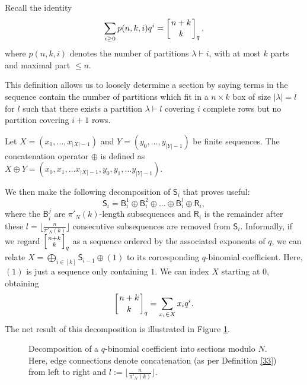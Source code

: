 \documentclass[12pt]{article}
\newcommand{\floor}[1]{{\lfloor{#1}\rfloor}}
\newcommand{\qbinom}[2]{\left[{#1 \atop #2}\right]_q}
\begin{document}
Recall the identity
\[\sum_{i\ge 0}{p(n,k,i)q^i} = \qbinom{n+k}{k},\]
where $p(n,k,i)$ denotes the number of partitions $\lambda \vdash i$, with at most $k$ parts and maximal part $\le n$. 

This definition allows us to loosely determine a section by saying terms in the sequence contain the number of partitions which fit in a $n\times k$ box of size $|\lambda|=l$ for $l$ such that there exists a partition $\lambda \vdash l$ covering $i$ complete rows but no partition covering $i+1$ rows.

\begin{definition}
\label{33}
Let $X=(x_0, \ldots , x_{|X|-1})$ and $Y=(y_0, \ldots , y_{|Y|-1})$ be finite sequences. The concatenation operator $\oplus$ is defined as $X \oplus Y = (x_0, x_1, \ldots x_{|X|-1}, y_0, y_1, \ldots y_{|Y|-1}).$
\end{definition}
We then make the following decomposition of $\mathsf{S}_i$ that proves useful:
\[\mathsf{S}_i = \mathsf{B}_i^1 \oplus \mathsf{B}_i^2 \oplus \ldots \oplus \mathsf{B}_i^l \oplus \mathsf{R}_i,\]
where the $\mathsf{B}_i^j$ are $\pi'_N(k)$-length subsequences and $\mathsf{R}_i$ is the remainder after these $l=\floor{\frac{n}{\pi'_N(k)}}$ consecutive subsequences are removed from $\mathsf{S}_i$. Informally, if we regard $\qbinom{n+k}{k}$ as a sequence ordered by the associated exponents of $q$, we can relate $X=\bigoplus_{i\in [k]}{\mathsf{S}_{i-1}}\oplus{(1)}$ to its corresponding $q$-binomial coefficient. Here, $(1)$ is just a sequence only containing $1$. We can index $X$ starting at $0$, obtaining
\[\qbinom{n+k}{k} = \sum_{x_i \in X}{x_i q^i}.\]
The net result of this decomposition is illustrated in Figure \ref{fig:sb}.

\begin{figure}[ht]
\begin{center}

\caption{Decomposition of a $q$-binomial coefficient into sections modulo $N$. Here, edge connections denote concatenation (as per Definition \ref{33}) from left to right and $l := \floor{\frac{n}{\pi'_N(k)}}$.}
\label{fig:sb}
\end{center}
\end{figure}
\end{document}
